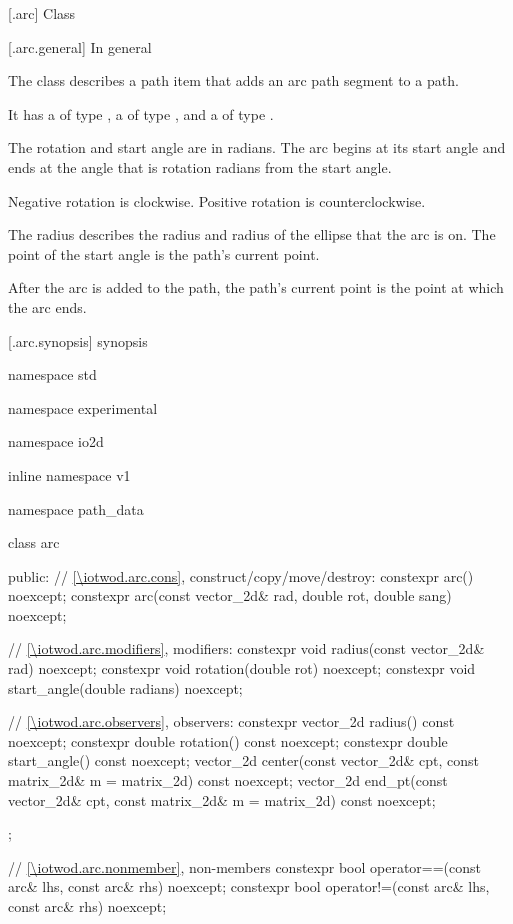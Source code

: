  [\iotwod.arc] {Class }%

 [\iotwod.arc.general] {In general}%

\pnum
{}%
The class  describes a path item that adds an arc path segment to a path.

\pnum
It has a  of type , a  of type , and a  of type .

\pnum
The rotation and start angle are in radians. The arc begins at its start angle and ends at the angle that is rotation radians from the start angle.

\pnum
\begin{note}
Negative rotation is clockwise. Positive rotation is counterclockwise.
\end{note}

\pnum
The radius describes the \xaxis radius and \yaxis radius of the ellipse that the arc is on. The point of the start angle is the path's current point.

\pnum
After the arc is added to the path, the path's current point is the point at which the arc ends.

 [\iotwod.arc.synopsis] { synopsis}%

\begin{codeblock}
namespace std { namespace experimental { namespace io2d { inline namespace v1 {
  namespace path_data {
    class arc {
    public:
      // \ref{\iotwod.arc.cons}, construct/copy/move/destroy:
      constexpr arc() noexcept;
      constexpr arc(const vector_2d& rad,
        double rot, double sang) noexcept;

      // \ref{\iotwod.arc.modifiers}, modifiers:
      constexpr void radius(const vector_2d& rad) noexcept;
      constexpr void rotation(double rot) noexcept;
      constexpr void start_angle(double radians) noexcept;

      // \ref{\iotwod.arc.observers}, observers:
      constexpr vector_2d radius() const noexcept;
      constexpr double rotation() const noexcept;
      constexpr double start_angle() const noexcept;
      vector_2d center(const vector_2d& cpt, const matrix_2d& m = matrix_2d{}) 
        const noexcept;
      vector_2d end_pt(const vector_2d& cpt, const matrix_2d& m = matrix_2d{}) 
        const noexcept;
    };
    
    // \ref{\iotwod.arc.nonmember}, non-members
    constexpr bool operator==(const arc& lhs, const arc& rhs) noexcept;
    constexpr bool operator!=(const arc& lhs, const arc& rhs) noexcept;
  }
} } } }
\end{codeblock}

